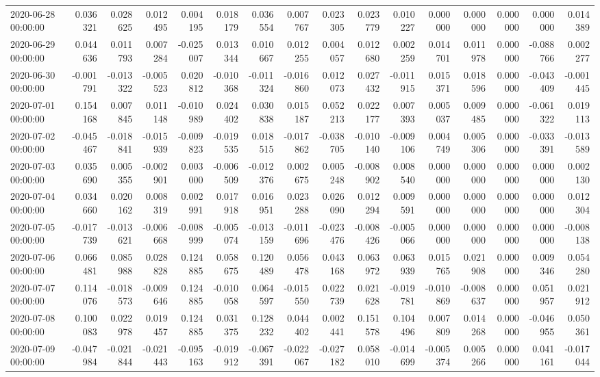 \begin{tabular}{lrrrrrrrrrrrrrrr}
2020-06-28 00:00:00 & 0.036321 & 0.028625 & 0.012495 & 0.004195 & 0.018179 & 0.036554 & 0.007767 & 0.023305 & 0.023779 & 0.010227 & 0.000000 & 0.000000 & 0.000000 & 0.000000 & 0.014389 \\
2020-06-29 00:00:00 & 0.044636 & 0.011793 & 0.007284 & -0.025007 & 0.013344 & 0.010667 & 0.012255 & 0.004057 & 0.012680 & 0.002259 & 0.014701 & 0.011978 & 0.000000 & -0.088766 & 0.002277 \\
2020-06-30 00:00:00 & -0.001791 & -0.013322 & -0.005523 & 0.020812 & -0.010368 & -0.011324 & -0.016860 & 0.012073 & 0.027432 & -0.011915 & 0.015371 & 0.018596 & 0.000000 & -0.043409 & -0.001445 \\
2020-07-01 00:00:00 & 0.154168 & 0.007845 & 0.011148 & -0.010989 & 0.024402 & 0.030838 & 0.015187 & 0.052213 & 0.022177 & 0.007393 & 0.005037 & 0.009485 & 0.000000 & -0.061322 & 0.019113 \\
2020-07-02 00:00:00 & -0.045467 & -0.018841 & -0.015939 & -0.009823 & -0.019535 & 0.018515 & -0.017862 & -0.038705 & -0.010140 & -0.009106 & 0.004749 & 0.005306 & 0.000000 & -0.033391 & -0.013589 \\
2020-07-03 00:00:00 & 0.035690 & 0.005355 & -0.002901 & 0.003000 & -0.006509 & -0.012376 & 0.002675 & 0.005248 & -0.008902 & 0.008540 & 0.000000 & 0.000000 & 0.000000 & 0.000000 & 0.002130 \\
2020-07-04 00:00:00 & 0.034660 & 0.020162 & 0.008319 & 0.002991 & 0.017918 & 0.016951 & 0.023288 & 0.026090 & 0.012294 & 0.009591 & 0.000000 & 0.000000 & 0.000000 & 0.000000 & 0.012304 \\
2020-07-05 00:00:00 & -0.017739 & -0.013621 & -0.006668 & -0.008999 & -0.005074 & -0.013159 & -0.011696 & -0.023476 & -0.008426 & -0.005066 & 0.000000 & 0.000000 & 0.000000 & 0.000000 & -0.008138 \\
2020-07-06 00:00:00 & 0.066481 & 0.085988 & 0.028828 & 0.124885 & 0.058675 & 0.120489 & 0.056478 & 0.043168 & 0.063972 & 0.063939 & 0.015765 & 0.021908 & 0.000000 & 0.009346 & 0.054280 \\
2020-07-07 00:00:00 & 0.114076 & -0.018573 & -0.009646 & 0.124885 & -0.010058 & 0.064597 & -0.015550 & 0.022739 & 0.021628 & -0.019781 & -0.010869 & -0.008637 & 0.000000 & 0.051957 & 0.021912 \\
2020-07-08 00:00:00 & 0.100083 & 0.022978 & 0.019457 & 0.124885 & 0.031375 & 0.128232 & 0.044402 & 0.002441 & 0.151578 & 0.104496 & 0.007809 & 0.014268 & 0.000000 & -0.046955 & 0.050361 \\
2020-07-09 00:00:00 & -0.047984 & -0.021844 & -0.021443 & -0.095163 & -0.019912 & -0.067391 & -0.022067 & -0.027182 & 0.058010 & -0.014699 & -0.005374 & 0.005266 & 0.000000 & 0.041161 & -0.017044 \\

\end{tabular}
